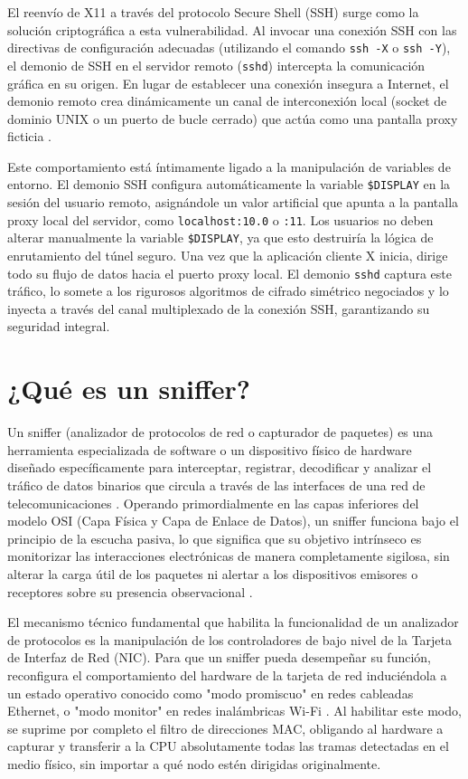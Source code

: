 \documentclass[a4paper,12pt]{article}
\begin{document}
El reenvío de X11 a través del protocolo Secure Shell (SSH) surge como la solución criptográfica a esta vulnerabilidad. Al invocar una conexión SSH con las directivas de configuración adecuadas (utilizando el comando \texttt{ssh -X} o \texttt{ssh -Y}), el demonio de SSH en el servidor remoto (\texttt{sshd}) intercepta la comunicación gráfica en su origen. En lugar de establecer una conexión insegura a Internet, el demonio remoto crea dinámicamente un canal de interconexión local (socket de dominio UNIX o un puerto de bucle cerrado) que actúa como una pantalla proxy ficticia \cite{ibm_x11}.

Este comportamiento está íntimamente ligado a la manipulación de variables de entorno. El demonio SSH configura automáticamente la variable \texttt{\$DISPLAY} en la sesión del usuario remoto, asignándole un valor artificial que apunta a la pantalla proxy local del servidor, como \texttt{localhost:10.0} o \texttt{:11}. Los usuarios no deben alterar manualmente la variable \texttt{\$DISPLAY}, ya que esto destruiría la lógica de enrutamiento del túnel seguro. Una vez que la aplicación cliente X inicia, dirige todo su flujo de datos hacia el puerto proxy local. El demonio \texttt{sshd} captura este tráfico, lo somete a los rigurosos algoritmos de cifrado simétrico negociados y lo inyecta a través del canal multiplexado de la conexión SSH, garantizando su seguridad integral.


\section{¿Qué es un sniffer?}

Un sniffer (analizador de protocolos de red o capturador de paquetes) es una herramienta especializada de software o un dispositivo físico de hardware diseñado específicamente para interceptar, registrar, decodificar y analizar el tráfico de datos binarios que circula a través de las interfaces de una red de telecomunicaciones \cite{cdmon_sniffers}. Operando primordialmente en las capas inferiores del modelo OSI (Capa Física y Capa de Enlace de Datos), un sniffer funciona bajo el principio de la escucha pasiva, lo que significa que su objetivo intrínseco es monitorizar las interacciones electrónicas de manera completamente sigilosa, sin alterar la carga útil de los paquetes ni alertar a los dispositivos emisores o receptores sobre su presencia observacional \cite{cdmon_sniffers}.

El mecanismo técnico fundamental que habilita la funcionalidad de un analizador de protocolos es la manipulación de los controladores de bajo nivel de la Tarjeta de Interfaz de Red (NIC). Para que un sniffer pueda desempeñar su función, reconfigura el comportamiento del hardware de la tarjeta de red induciéndola a un estado operativo conocido como "modo promiscuo" en redes cableadas Ethernet, o "modo monitor" en redes inalámbricas Wi-Fi \cite{cdmon_sniffers}. Al habilitar este modo, se suprime por completo el filtro de direcciones MAC, obligando al hardware a capturar y transferir a la CPU absolutamente todas las tramas detectadas en el medio físico, sin importar a qué nodo estén dirigidas originalmente.
\end{document}
